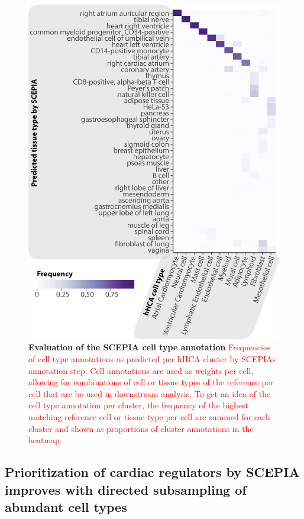 \begin{figure}
    \centering
    \includegraphics[width=0.75\linewidth]{ch.scepia/imgs/SCEPIA Annotation Heatmap All Cells 40deg Rotated Figure 4_noDend.png}
    \caption{\textbf{Evaluation of the SCEPIA cell type annotation} \textcolor{red}{Frequencies of cell type annotations as predicted per hHCA cluster by SCEPIAs annotation step. Cell annotations are used as weights per cell, allowing for combinations of cell or tissue types of the reference per cell that are be used in downstream analysis. To get an idea of the cell type annotation per cluster, the frequency of the highest matching reference cell or tissue type per cell are summed for each cluster and shown as proportions of cluster annotations in the heatmap.}}
    \label{fig:scepia_annohm}
\end{figure}

\subsection{Prioritization of cardiac regulators by SCEPIA improves with directed subsampling of abundant cell types}

